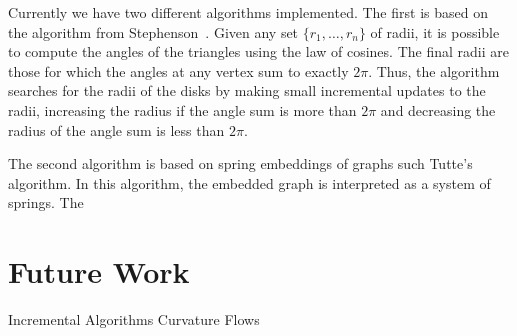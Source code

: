 \documentclass[a4paper,UKenglish]{lipics}
\begin{document}
  Currently we have two different algorithms implemented.
  The first is based on the algorithm from Stephenson~\cite{stephenson05introduction}.
  Given any set $\{r_1,\ldots, r_n\}$ of radii, it is possible to compute the angles of the triangles using the law of cosines.
  The final radii are those for which the angles at any vertex sum to exactly $2\pi$.
  Thus, the algorithm searches for the radii of the disks by making small incremental updates to the radii, increasing the radius if the angle sum is more than $2\pi$ and decreasing the radius of the angle sum is less than $2\pi$.
  
  The second algorithm is based on spring embeddings of graphs such Tutte's algorithm.
  In this algorithm, the embedded graph is interpreted as a system of springs. 
  The


\section{Future Work} %
\label{sec:future_work}

  Incremental Algorithms
  Curvature Flows






%
\end{document}
